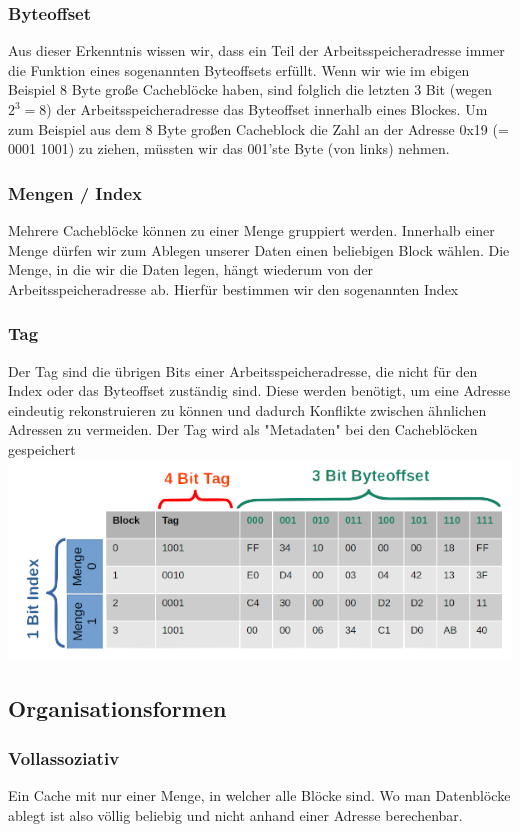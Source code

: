 		\subsubsection{Byteoffset}
			Aus dieser Erkenntnis wissen wir, dass ein Teil der Arbeitsspeicheradresse immer die Funktion eines sogenannten Byteoffsets erfüllt. Wenn wir wie im ebigen Beispiel 8 Byte große Cacheblöcke haben, sind folglich die letzten 3 Bit (wegen $2^3=8$) der Arbeitsspeicheradresse das Byteoffset innerhalb eines Blockes. Um zum Beispiel aus dem 8 Byte großen Cacheblock die Zahl an der Adresse 0x19 (= 0001 1001) zu ziehen, müssten wir das 001'ste Byte (von links) nehmen.
		\subsubsection{Mengen / Index}
			Mehrere Cacheblöcke können zu einer Menge gruppiert werden. Innerhalb einer Menge dürfen wir zum Ablegen unserer Daten einen beliebigen Block wählen. Die Menge, in die wir die Daten legen, hängt wiederum von der Arbeitsspeicheradresse ab. Hierfür bestimmen wir den sogenannten Index
		\subsubsection{Tag}
			Der Tag sind die übrigen Bits einer Arbeitsspeicheradresse, die nicht für den Index oder das Byteoffset zuständig sind. Diese werden benötigt, um eine Adresse eindeutig rekonstruieren zu können und dadurch Konflikte zwischen ähnlichen Adressen zu vermeiden. Der Tag wird als "Metadaten" bei den Cacheblöcken gespeichert
			\newline
		\includegraphics[scale=0.6]{tag.png}
	\subsection{Organisationsformen}
		\subsubsection{Vollassoziativ}
			 Ein Cache mit nur einer Menge, in welcher alle Blöcke sind. Wo man Datenblöcke ablegt ist also völlig beliebig und nicht anhand einer Adresse berechenbar.
